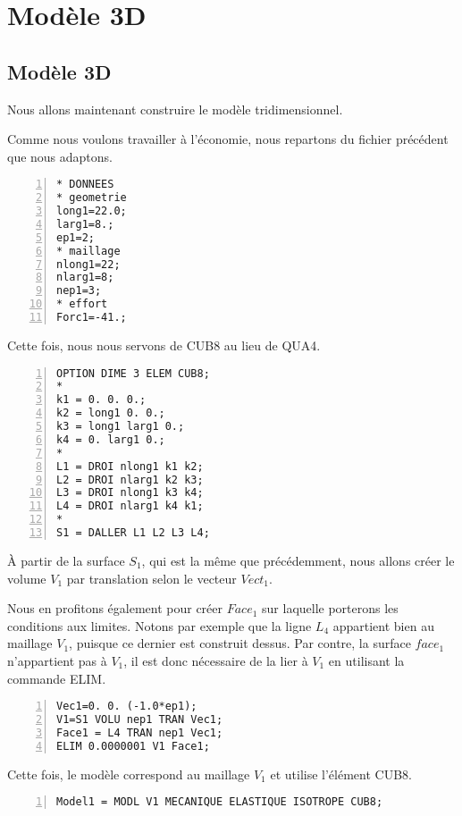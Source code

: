 \medskip
\ifVersionAvecExemplesSepares
   \section{Modèle 3D}
\else
   \subsection{Modèle 3D}
\fi

Nous allons maintenant construire le modèle tridimensionnel.

Comme nous voulons travailler à l'économie, nous repartons du fichier précédent que nous adaptons.

\begin{Verbatim}[numbers=left,numbersep=3pt]
* DONNEES
* geometrie
long1=22.0;
larg1=8.;
ep1=2;
* maillage
nlong1=22;
nlarg1=8;
nep1=3;
* effort
Forc1=-41.;
\end{Verbatim}

\medskip
Cette fois, nous nous servons de CUB8 au lieu de QUA4.

\begin{Verbatim}[numbers=left,numbersep=3pt,firstnumber=last]
OPTION DIME 3 ELEM CUB8;
*
k1 = 0. 0. 0.;
k2 = long1 0. 0.;
k3 = long1 larg1 0.;
k4 = 0. larg1 0.;
*
L1 = DROI nlong1 k1 k2;
L2 = DROI nlarg1 k2 k3;
L3 = DROI nlong1 k3 k4;
L4 = DROI nlarg1 k4 k1;
*
S1 = DALLER L1 L2 L3 L4;
\end{Verbatim}

\medskip
À partir de la surface $S_1$, qui est la même que précédemment, nous allons créer le volume $V_1$ par translation
selon le vecteur $Vect_1$.

Nous en profitons également pour créer $Face_1$ sur laquelle porterons les conditions aux limites.
Notons par exemple que la ligne $L_4$ appartient bien au maillage $V_1$, puisque ce dernier est construit dessus.
Par contre, la surface $face_1$ n'appartient pas à $V_1$, il est donc nécessaire de la lier à $V_1$ en utilisant
la commande ELIM.

\begin{Verbatim}[numbers=left,numbersep=3pt,firstnumber=last]
Vec1=0. 0. (-1.0*ep1);
V1=S1 VOLU nep1 TRAN Vec1;
Face1 = L4 TRAN nep1 Vec1;
ELIM 0.0000001 V1 Face1;
\end{Verbatim}

\medskip
Cette fois, le modèle correspond au maillage $V_1$ et utilise l'élément CUB8.

\begin{Verbatim}[numbers=left,numbersep=3pt,firstnumber=last]
Model1 = MODL V1 MECANIQUE ELASTIQUE ISOTROPE CUB8;
\end{Verbatim}

